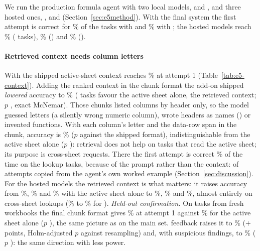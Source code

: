 We run the production formula agent with two local models, \efAName{} and \efBName, and three hosted ones, \efDName, \efEName{} and \efFName{} (Section~\ref{sec:e5method}). With the final system the first attempt is correct for \efAfinal\% of the \efAN{} tasks with \efAName{} and \efBfinal\% with \efBName; the hosted models reach \efDfinal\% (\efDN{} tasks), \efEfinal\% (\efEN) and \efFfinal\% (\efFN).

\paragraph{Retrieved context needs column letters}

With the shipped active-sheet context \efAName{} reaches \efAflat\% at attempt 1 (Table~\ref{tab:e5-context}). Adding the ranked context in the chunk format the add-on shipped \emph{lowered} accuracy to \efAshipped\% (\efATestshippedvsflatB{} tasks favour the active sheet alone, \efATestshippedvsflatA{} the retrieved context; $p$ \efATestshippedvsflatP, exact McNemar). Those chunks listed columns by header only, so the model guessed letters (a silently wrong numeric column), wrote headers as names () or invented functions. With each column's letter and the data-row span in the chunk, accuracy is \efAfinal\% ($p$ \efATestfinalvsshippedP{} against the shipped format), indistinguishable from the active sheet alone ($p$ \efATestfinalvsflatP): retrieval does not help on tasks that read the active sheet; its purpose is cross-sheet requests. There the first attempt is correct \efAfinalLookup\% of the time on the \efAfinalLookupN{} lookup tasks, because of the prompt rather than the context: \efALkSheetTwo{} of \efALkN{} attempts copied  from the agent's own worked example (Section~\ref{sec:discussion}). For the hosted models the retrieved context is what matters: it raises accuracy from \efDflat\%, \efEflat\% and \efFflat\% with the active sheet alone to \efDfinal\%, \efEfinal\% and \efFfinal\%, almost entirely on cross-sheet lookups (\efDflatLookup\% to \efDfinalLookup\% for \efDName).
\ifdefined\efCN
\emph{Held-out confirmation.} On \efCN{} tasks from fresh workbooks the final chunk format gives \efCfinal\% at attempt 1 against \efCflat\% for the active sheet alone ($p$ \efCTestfinalvsflatP), the same picture as on the main set. \gc{} feedback raises it to \efCSvtwofb\% ($+$\efCSvtwofbD{} points, Holm-adjusted $p$ \hmCHolmVtwoRes{} against resampling) and, with suspicious findings, to \efCSvtwofbplussusp\% ($p$ \hmCHolmSuspRes): the same direction with less power.
\fi

